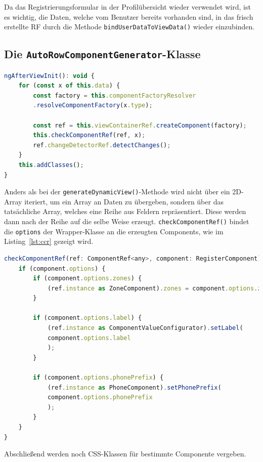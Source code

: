 Da das Registrierungsformular in der Profilübersicht wieder verwendet wird, ist es wichtig, die Daten, welche vom Benutzer bereits vorhanden sind, in das frisch erstellte RF durch die Methode \texttt{bindUserDataToViewData()} wieder einzubinden.

\subsection{Die \texttt{AutoRowComponentGenerator}-Klasse}

\begin{lstlisting}[caption={Die \texttt{ngAfterViewInit()}-Methode der \texttt{AutoRowComponentGenerator}-Klasse},captionpos=b, language=JavaScript,label={lst:nginARCG}]
ngAfterViewInit(): void {
	for (const x of this.data) {
		const factory = this.componentFactoryResolver
		.resolveComponentFactory(x.type);
		
		const ref = this.viewContainerRef.createComponent(factory);
		this.checkComponentRef(ref, x);
		ref.changeDetectorRef.detectChanges();
	}
	this.addClasses();
}
\end{lstlisting}

Anders als bei der \texttt{generateDynamicView()}-Methode wird nicht über ein 2D-Array iteriert, um ein Array an Daten zu übergeben, sondern über das tatsächliche Array, welches eine Reihe aus Feldern repräsentiert. Diese werden dann nach der Reihe auf die selbe Weise erzeugt. \texttt{checkComponentRef()} bindet die \texttt{options} der Wrapper-Klasse an die erzeugten Components, wie im Listing~\ref{lst:ccr} gezeigt wird.

\begin{lstlisting}[caption={Die \texttt{checkComponentRef()}-Methode der \texttt{AutoRowComponentGenerator}-Klasse},captionpos=b, language=JavaScript,label={lst:ccr}]
checkComponentRef(ref: ComponentRef<any>, component: RegisterComponent) {
	if (component.options) {
		if (component.options.zones) {
			(ref.instance as ZoneComponent).zones = component.options.zones;
		}
		
		if (component.options.label) {
			(ref.instance as ComponentValueConfigurator).setLabel(
			component.options.label
			);
		}
		
		if (component.options.phonePrefix) {
			(ref.instance as PhoneComponent).setPhonePrefix(
			component.options.phonePrefix
			);
		}
	}
}
\end{lstlisting}

Abschließend werden noch CSS-Klassen für bestimmte Componente vergeben.

